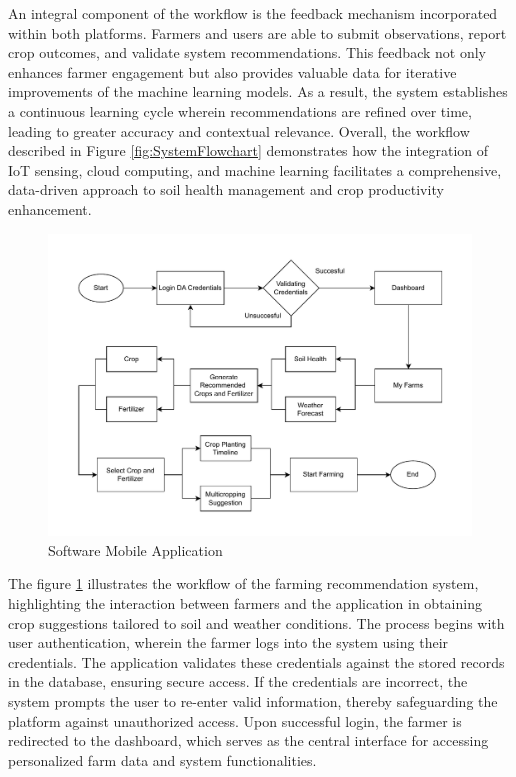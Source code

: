 {	An integral component of the workflow is the feedback mechanism incorporated within both platforms. Farmers and users are able to submit observations, report crop outcomes, and validate system recommendations. This feedback not only enhances farmer engagement but also provides valuable data for iterative improvements of the machine learning models. As a result, the system establishes a continuous learning cycle wherein recommendations are refined over time, leading to greater accuracy and contextual relevance. Overall, the workflow described in Figure \ref{fig:SystemFlowchart} demonstrates how the integration of IoT sensing, cloud computing, and machine learning facilitates a comprehensive, data-driven approach to soil health management and crop productivity enhancement.
	
	\begin{figure}[H]
		\centering
		\caption{Software Mobile Application}
		\label{fig:MobileFlowchart}
		\includegraphics[width=1\textwidth]{figures/soft flow.pdf}
	\end{figure}
	
	The figure \ref{fig:MobileFlowchart} illustrates the workflow of the farming recommendation system, highlighting the interaction between farmers and the application in obtaining crop suggestions tailored to soil and weather conditions. The process begins with user authentication, wherein the farmer logs into the system using their credentials. The application validates these credentials against the stored records in the database, ensuring secure access. If the credentials are incorrect, the system prompts the user to re-enter valid information, thereby safeguarding the platform against unauthorized access. Upon successful login, the farmer is redirected to the dashboard, which serves as the central interface for accessing personalized farm data and system functionalities.
	
}
